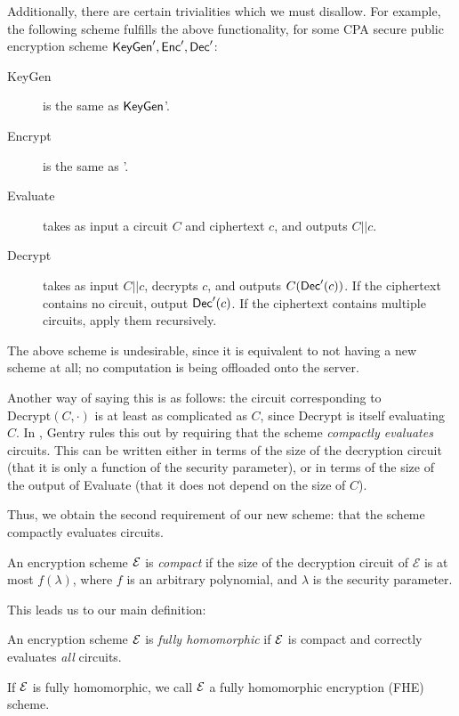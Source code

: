 Additionally, there are certain trivialities which we must disallow. For example, the following scheme fulfills the above functionality, for some CPA secure public encryption scheme ${\sf KeyGen}', {\sf Enc}', {\sf Dec}'$:
\begin{description}
\item[KeyGen] is the same as ${\sf KeyGen}$'.
\item[Encrypt] is the same as \Enc'.
\item[Evaluate] takes as input a circuit $C$ and ciphertext $c$, and outputs $C || c$.
\item[Decrypt] takes as input $C || c$, decrypts $c$, and outputs $C({\sf Dec}'(c))$. If the ciphertext contains no circuit, output ${\sf Dec}'(c)$. If the ciphertext contains multiple circuits, apply them recursively.
\end{description}

The above scheme is undesirable, since it is equivalent to not having a new scheme at all; no computation is being offloaded onto the server.

Another way of saying this is as follows: the circuit corresponding to $\text{Decrypt}(C, \cdot)$ is at least as complicated as $C$, since Decrypt is itself evaluating $C$.  In \cite{gentry2009fully}, Gentry rules this out by requiring that the scheme \textit{compactly evaluates} circuits. This can be written either in terms of the size of the decryption circuit (that it is only a function of the security parameter), or in terms of the size of the output of Evaluate (that it does not depend on the size of $C$).

Thus, we obtain the second requirement of our new scheme: that the scheme compactly evaluates circuits.

\begin{definition}
An encryption scheme $\mathcal{E}$ is \emph{compact}  if the size of the decryption circuit of $\mathcal{E}$ is at most $f(\lambda)$, where $f$ is an arbitrary polynomial, and $\lambda$ is the security parameter.
\end{definition}


This leads us to our main definition:

\begin{definition} \label{def: fhe}
An encryption scheme $\mathcal{E}$ is \emph{fully homomorphic} if $\mathcal{E}$ is compact and correctly evaluates \emph{all} circuits.
\end{definition}

If $\mathcal{E}$ is fully homomorphic, we call $\mathcal{E}$ a fully homomorphic encryption (FHE) scheme.

